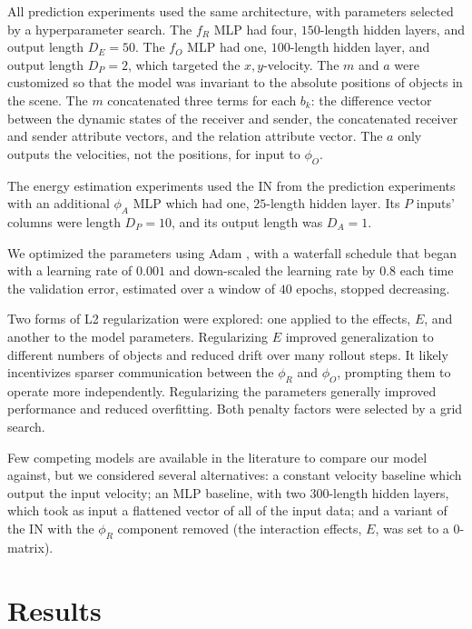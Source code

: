 \documentclass{article}
\newcommand{\DE}{D_E}
\newcommand{\DP}{D_P}
\newcommand{\DA}{D_A}
\begin{document}
All prediction experiments used the same architecture, with parameters
selected by a hyperparameter search. The $f_R$ MLP had four,
$150$-length hidden layers, and output length $\DE=50$. The $f_O$ MLP
had one, $100$-length hidden layer, and output length $\DP=2$, which
targeted the $x,y$-velocity. The $m$ and $a$ were customized so that
the model was invariant to the absolute positions of objects in the
scene. The $m$ concatenated three terms for each $b_k$: the difference
vector between the dynamic states of the receiver and sender, the
concatenated receiver and sender attribute vectors, and the relation
attribute vector. The $a$ only outputs the velocities, not the
positions, for input to $\phi_O$.

The energy estimation experiments used the IN from the prediction
experiments with an additional $\phi_A$ MLP which had one, $25$-length
hidden layer. Its $P$ inputs' columns were length $\DP=10$, and its
output length was $\DA=1$.

We optimized the parameters using Adam \cite{kingma2014adam}, with a
waterfall schedule that began with a learning rate of $0.001$ and
down-scaled the learning rate by $0.8$ each time the validation error,
estimated over a window of $40$ epochs, stopped decreasing.

Two forms of L2 regularization were explored: one applied to the
effects, $E$, and another to the model parameters. Regularizing $E$
improved generalization to different numbers of objects and reduced
drift over many rollout steps. It likely incentivizes sparser
communication between the $\phi_R$ and $\phi_O$, prompting them to
operate more independently. Regularizing the parameters generally
improved performance and reduced overfitting. Both penalty factors
were selected by a grid search.

Few competing models are available in the literature to compare our
model against, but we considered several alternatives: a constant
velocity baseline which output the input velocity; an MLP baseline,
with two $300$-length hidden layers, which took as input a flattened
vector of all of the input data; and a variant of the IN with the
$\phi_R$ component removed (the interaction effects, $E$, was set to a
$0$-matrix).


\section{Results}
\end{document}

